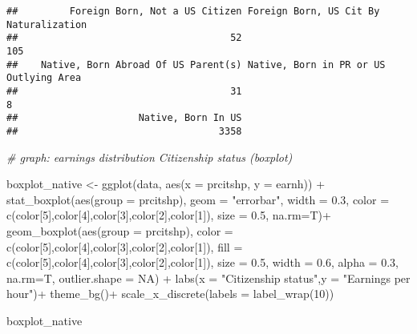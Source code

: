 \documentclass[
]{article}
\newenvironment{Shaded}{\begin{snugshade}}{\end{snugshade}}
\newcommand{\AttributeTok}[1]{\textcolor[rgb]{0.77,0.63,0.00}{#1}}
\newcommand{\CommentTok}[1]{\textcolor[rgb]{0.56,0.35,0.01}{\textit{#1}}}
\newcommand{\ConstantTok}[1]{\textcolor[rgb]{0.00,0.00,0.00}{#1}}
\newcommand{\DecValTok}[1]{\textcolor[rgb]{0.00,0.00,0.81}{#1}}
\newcommand{\FloatTok}[1]{\textcolor[rgb]{0.00,0.00,0.81}{#1}}
\newcommand{\FunctionTok}[1]{\textcolor[rgb]{0.00,0.00,0.00}{#1}}
\newcommand{\NormalTok}[1]{#1}
\newcommand{\OtherTok}[1]{\textcolor[rgb]{0.56,0.35,0.01}{#1}}
\newcommand{\SpecialCharTok}[1]{\textcolor[rgb]{0.00,0.00,0.00}{#1}}
\newcommand{\StringTok}[1]{\textcolor[rgb]{0.31,0.60,0.02}{#1}}
\begin{document}
\begin{verbatim}
##         Foreign Born, Not a US Citizen Foreign Born, US Cit By Naturalization 
##                                     52                                    105 
##    Native, Born Abroad Of US Parent(s) Native, Born in PR or US Outlying Area 
##                                     31                                      8 
##                     Native, Born In US 
##                                   3358
\end{verbatim}

\begin{Shaded}
\begin{Highlighting}[]
\CommentTok{\# graph: earnings distribution Citizenship status (boxplot)}

\NormalTok{boxplot\_native }\OtherTok{\textless{}{-}} \FunctionTok{ggplot}\NormalTok{(data, }\FunctionTok{aes}\NormalTok{(}\AttributeTok{x =}\NormalTok{ prcitshp, }\AttributeTok{y =}\NormalTok{ earnh)) }\SpecialCharTok{+}
  \FunctionTok{stat\_boxplot}\NormalTok{(}\FunctionTok{aes}\NormalTok{(}\AttributeTok{group =}\NormalTok{ prcitshp), }\AttributeTok{geom =} \StringTok{"errorbar"}\NormalTok{, }\AttributeTok{width =} \FloatTok{0.3}\NormalTok{,}
               \AttributeTok{color =} \FunctionTok{c}\NormalTok{(color[}\DecValTok{5}\NormalTok{],color[}\DecValTok{4}\NormalTok{],color[}\DecValTok{3}\NormalTok{],color[}\DecValTok{2}\NormalTok{],color[}\DecValTok{1}\NormalTok{]), }\AttributeTok{size =} \FloatTok{0.5}\NormalTok{, }\AttributeTok{na.rm=}\NormalTok{T)}\SpecialCharTok{+}
  \FunctionTok{geom\_boxplot}\NormalTok{(}\FunctionTok{aes}\NormalTok{(}\AttributeTok{group =}\NormalTok{ prcitshp),}
               \AttributeTok{color =} \FunctionTok{c}\NormalTok{(color[}\DecValTok{5}\NormalTok{],color[}\DecValTok{4}\NormalTok{],color[}\DecValTok{3}\NormalTok{],color[}\DecValTok{2}\NormalTok{],color[}\DecValTok{1}\NormalTok{]), }\AttributeTok{fill =} \FunctionTok{c}\NormalTok{(color[}\DecValTok{5}\NormalTok{],color[}\DecValTok{4}\NormalTok{],color[}\DecValTok{3}\NormalTok{],color[}\DecValTok{2}\NormalTok{],color[}\DecValTok{1}\NormalTok{]),}
               \AttributeTok{size =} \FloatTok{0.5}\NormalTok{, }\AttributeTok{width =} \FloatTok{0.6}\NormalTok{, }\AttributeTok{alpha =} \FloatTok{0.3}\NormalTok{, }\AttributeTok{na.rm=}\NormalTok{T, }\AttributeTok{outlier.shape =} \ConstantTok{NA}\NormalTok{) }\SpecialCharTok{+}
  \FunctionTok{labs}\NormalTok{(}\AttributeTok{x =} \StringTok{"Citizenship status"}\NormalTok{,}\AttributeTok{y =} \StringTok{"Earnings per hour"}\NormalTok{)}\SpecialCharTok{+}
  \FunctionTok{theme\_bg}\NormalTok{()}\SpecialCharTok{+}
    \FunctionTok{scale\_x\_discrete}\NormalTok{(}\AttributeTok{labels =} \FunctionTok{label\_wrap}\NormalTok{(}\DecValTok{10}\NormalTok{)) }

\NormalTok{boxplot\_native}
\end{Highlighting}
\end{Shaded}
\end{document}
